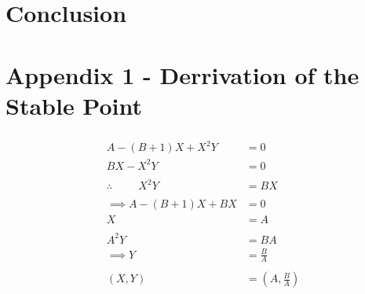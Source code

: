 \documentclass[reprint, amsmath, amssymb, aps]{revtex4-2}
\begin{document}
\section{Conclusion}

\clearpage


\clearpage

\section*{Appendix 1 - Derrivation of the Stable Point}
\begin{align*}
	\begin{aligned}
	A - (B + 1)X + X^2 Y &= 0\\
	BX - X^2 Y &= 0\\
	\\
	\therefore \hspace{1cm} X^2 Y &= BX\\
	\\
	\implies A - (B + 1)X + BX &= 0\\
	X &= A\\
	\\
	A^2 Y &= BA\\
	\implies Y &= \frac{B}{A}\\
	\\
	(X, Y) &= \left(A, \frac{B}{A}\right)
	\end{aligned}
\end{align*}
\end{document}
